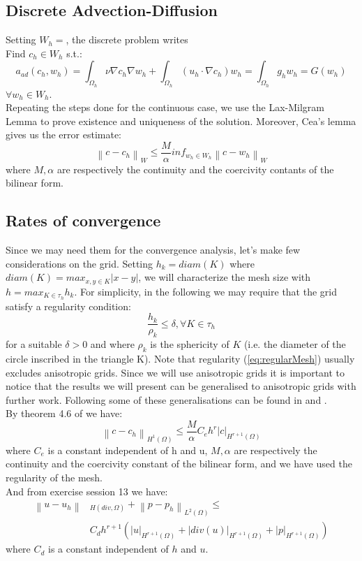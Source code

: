 \documentclass[conference]{IEEEtran}
\newcommand{\norm}[1]{\left\lVert#1\right\rVert}
\begin{document}
\subsection{Discrete Advection-Diffusion}
Setting $W_h=$, the discrete problem writes\\
Find $c_h \in W_h$ s.t.:
\begin{equation}
	  a_{ad}(c_h,w_h) = \int_{\Omega_h} \nu \nabla c_h \nabla w_h
      + \int_{\Omega_h} (u_h \cdot \nabla c_h) w_h
      = \int_{\Omega_h} g_h w_h = G(w_h)   	
\end{equation}
$\forall w_h \in W_h$.\\
Repeating the steps done for the continuous case, we use the Lax-Milgram Lemma to prove existence and uniqueness of the solution. Moreover, Cea's lemma gives us the error estimate:\\
$$ \norm{c-c_h}_W \leq \frac{M}{\alpha} inf_{w_h \in W_h} \norm{c-w_h}_W $$
where $M,\alpha$ are respectively the continuity and the coercivity contants of the bilinear form.

\subsection{Rates of convergence}
Since we may need them for the convergence analysis, let's make few considerations on the grid. Setting $h_k=diam(K)$ where $diam(K)=max_{x,y\in K}|x-y|$, we will characterize the mesh size with $h=max_{K\in \tau_h} h_k$. For simplicity, in the following we may require that the grid satisfy a regularity condition:
\begin{equation}
	\frac{h_k}{\rho_k} \leq \delta , \forall K \in \tau_h
	\label{eq:regularMesh}
\end{equation}
for a suitable $\delta > 0$ and where $\rho_k$ is the sphericity of $K$ (i.e. the diameter of the circle inscribed in the triangle K). Note that regularity (\ref{eq:regularMesh}) usually excludes anisotropic grids. Since we will use anisotropic grids it is important to notice that the results we will present can be generalised to anisotropic grids with further work. Following \cite{Perotto} some of these generalisations can be found in \cite{anisotropic} and \cite{anisotropic2}.\\

By theorem 4.6 of \cite{Perotto} we have:
$$ \norm{c-c_h}_{H^1(\Omega)} \leq \frac{M}{\alpha} C_e h^r |c|_{H^{r+1}(\Omega)} $$
where $C_e$ is a constant independent of h and u, $M,\alpha$ are respectively the continuity and the coercivity constant of the bilinear form, and we have used the regularity of the mesh. \\
And from exercise session 13 we have:
\begin{align*}
	\norm{u-u_h}&_{H(div,\Omega)} + \norm{p-p_h}_{L^2(\Omega)} \leq  \\
	&C_d h^{r+1}
(|u|_{H^{r+1}(\Omega)}+|div(u)|_{H^{r+1}(\Omega)}+|p|_{H^{r+1}(\Omega)})
\end{align*}
where $C_d$ is a constant independent of $h$ and $u$.
\end{document}
